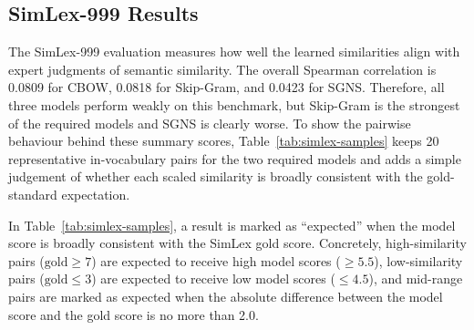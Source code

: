 \documentclass[11pt,a4paper]{article}
\begin{document}
\subsection{SimLex-999 Results}
The SimLex-999 evaluation measures how well the learned similarities align with expert judgments of semantic similarity. The overall Spearman correlation is 0.0809 for CBOW, 0.0818 for Skip-Gram, and 0.0423 for SGNS. Therefore, all three models perform weakly on this benchmark, but Skip-Gram is the strongest of the required models and SGNS is clearly worse. To show the pairwise behaviour behind these summary scores, Table~\ref{tab:simlex-samples} keeps 20 representative in-vocabulary pairs for the two required models and adds a simple judgement of whether each scaled similarity is broadly consistent with the gold-standard expectation.

In Table~\ref{tab:simlex-samples}, a result is marked as ``expected'' when the model score is broadly consistent with the SimLex gold score. Concretely, high-similarity pairs ($\text{gold} \geq 7$) are expected to receive high model scores ($\geq 5.5$), low-similarity pairs ($\text{gold} \leq 3$) are expected to receive low model scores ($\leq 4.5$), and mid-range pairs are marked as expected when the absolute difference between the model score and the gold score is no more than 2.0.
\end{document}
